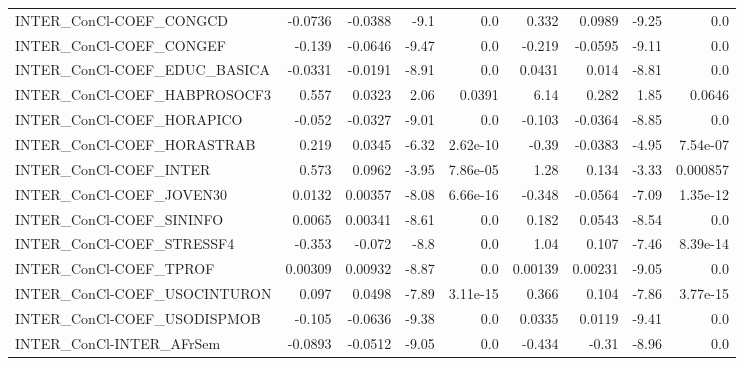 \begin{tabular}{lrrrrrrrr}
INTER\_ConCl-COEF\_CONGCD                &     -0.0736 &      -0.0388 &     -9.1 &      0.0 &      0.332 &      0.0989 &        -9.25 &           0.0 \\
INTER\_ConCl-COEF\_CONGEF                &      -0.139 &      -0.0646 &    -9.47 &      0.0 &     -0.219 &     -0.0595 &        -9.11 &           0.0 \\
INTER\_ConCl-COEF\_EDUC\_BASICA           &     -0.0331 &      -0.0191 &    -8.91 &      0.0 &     0.0431 &       0.014 &        -8.81 &           0.0 \\
INTER\_ConCl-COEF\_HABPROSOCF3           &       0.557 &       0.0323 &     2.06 &   0.0391 &       6.14 &       0.282 &         1.85 &        0.0646 \\
INTER\_ConCl-COEF\_HORAPICO              &      -0.052 &      -0.0327 &    -9.01 &      0.0 &     -0.103 &     -0.0364 &        -8.85 &           0.0 \\
INTER\_ConCl-COEF\_HORASTRAB             &       0.219 &       0.0345 &    -6.32 & 2.62e-10 &      -0.39 &     -0.0383 &        -4.95 &      7.54e-07 \\
INTER\_ConCl-COEF\_INTER                 &       0.573 &       0.0962 &    -3.95 & 7.86e-05 &       1.28 &       0.134 &        -3.33 &      0.000857 \\
INTER\_ConCl-COEF\_JOVEN30               &      0.0132 &      0.00357 &    -8.08 & 6.66e-16 &     -0.348 &     -0.0564 &        -7.09 &      1.35e-12 \\
INTER\_ConCl-COEF\_SININFO               &      0.0065 &      0.00341 &    -8.61 &      0.0 &      0.182 &      0.0543 &        -8.54 &           0.0 \\
INTER\_ConCl-COEF\_STRESSF4              &      -0.353 &       -0.072 &     -8.8 &      0.0 &       1.04 &       0.107 &        -7.46 &      8.39e-14 \\
INTER\_ConCl-COEF\_TPROF                 &     0.00309 &      0.00932 &    -8.87 &      0.0 &    0.00139 &     0.00231 &        -9.05 &           0.0 \\
INTER\_ConCl-COEF\_USOCINTURON           &       0.097 &       0.0498 &    -7.89 & 3.11e-15 &      0.366 &       0.104 &        -7.86 &      3.77e-15 \\
INTER\_ConCl-COEF\_USODISPMOB            &      -0.105 &      -0.0636 &    -9.38 &      0.0 &     0.0335 &      0.0119 &        -9.41 &           0.0 \\
INTER\_ConCl-INTER\_AFrSem               &     -0.0893 &      -0.0512 &    -9.05 &      0.0 &     -0.434 &       -0.31 &        -8.96 &           0.0 \\

\end{tabular}
